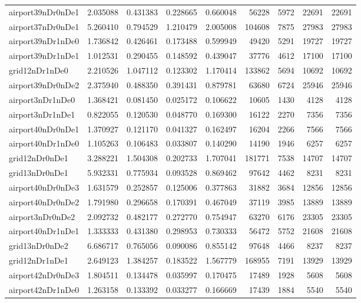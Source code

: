 \documentclass[../../../thesis.tex]{subfiles}
\begin{document}
\begin{longtable}{|l|r|r|r|r|r|r|r|r|}
airport39nDr0nDe1 & 2.035088 & 0.431383 & 0.228665 & 0.660048 & 56228 & 5972 & 22691 & 22691 \\
airport37nDr0nDe1 & 5.260410 & 0.794529 & 1.210479 & 2.005008 & 104608 & 7875 & 27983 & 27983 \\
airport39nDr1nDe0 & 1.736842 & 0.426461 & 0.173488 & 0.599949 & 49420 & 5291 & 19727 & 19727 \\
airport39nDr1nDe1 & 1.012531 & 0.290455 & 0.148592 & 0.439047 & 37776 & 4612 & 17100 & 17100 \\
grid12nDr1nDe0 & 2.210526 & 1.047112 & 0.123302 & 1.170414 & 133862 & 5694 & 10692 & 10692 \\
airport39nDr0nDe2 & 2.375940 & 0.488350 & 0.391431 & 0.879781 & 63680 & 6724 & 25946 & 25946 \\
airport3nDr1nDe0 & 1.368421 & 0.081450 & 0.025172 & 0.106622 & 10605 & 1430 & 4128 & 4128 \\
airport3nDr1nDe1 & 0.822055 & 0.120530 & 0.048770 & 0.169300 & 16122 & 2270 & 7356 & 7356 \\
airport40nDr0nDe1 & 1.370927 & 0.121170 & 0.041327 & 0.162497 & 16204 & 2266 & 7566 & 7566 \\
airport40nDr1nDe0 & 1.105263 & 0.106483 & 0.033807 & 0.140290 & 14190 & 1946 & 6257 & 6257 \\
grid12nDr0nDe1 & 3.288221 & 1.504308 & 0.202733 & 1.707041 & 181771 & 7538 & 14707 & 14707 \\
grid13nDr0nDe1 & 5.932331 & 0.775934 & 0.093528 & 0.869462 & 97642 & 4462 & 8231 & 8231 \\
airport40nDr0nDe3 & 1.631579 & 0.252857 & 0.125006 & 0.377863 & 31882 & 3684 & 12856 & 12856 \\
airport40nDr0nDe2 & 1.791980 & 0.296658 & 0.170391 & 0.467049 & 37119 & 3985 & 13889 & 13889 \\
airport3nDr0nDe2 & 2.092732 & 0.482177 & 0.272770 & 0.754947 & 63270 & 6176 & 23305 & 23305 \\
airport40nDr1nDe1 & 1.333333 & 0.431380 & 0.298953 & 0.730333 & 56472 & 5752 & 21608 & 21608 \\
grid13nDr0nDe2 & 6.686717 & 0.765056 & 0.090086 & 0.855142 & 97648 & 4466 & 8237 & 8237 \\
grid12nDr1nDe1 & 2.649123 & 1.384257 & 0.183522 & 1.567779 & 168955 & 7191 & 13929 & 13929 \\
airport42nDr0nDe3 & 1.804511 & 0.134478 & 0.035997 & 0.170475 & 17489 & 1928 & 5608 & 5608 \\
airport42nDr1nDe0 & 1.263158 & 0.133392 & 0.033277 & 0.166669 & 17439 & 1884 & 5540 & 5540 \\

\end{longtable}
\end{document}
